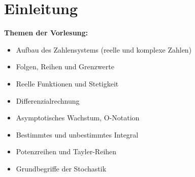 \chapter*{Einleitung} 
\textbf{Themen der Vorlesung:}
\begin{itemize}
    \item Aufbau des Zahlensystems (reelle und komplexe Zahlen)
    \item Folgen, Reihen und Grenzwerte
    \item Reelle Funktionen und Stetigkeit
    \item Differenzialrechnung
    \item Asymptotisches Wachstum, O-Notation
    \item Bestimmtes und unbestimmtes Integral
    \item Potenzreihen und Tayler-Reihen
    \item Grundbegriffe der Stochastik
\end{itemize}
